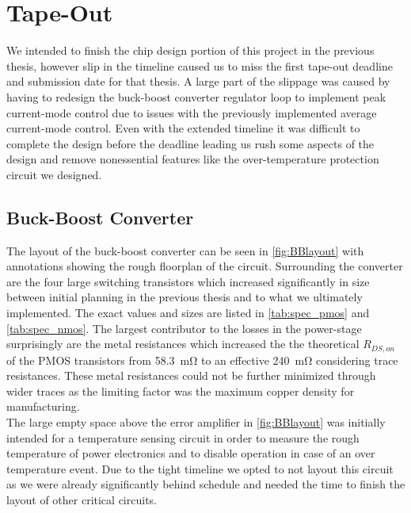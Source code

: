 \section{Tape-Out}
\label{sec:tapout}

We intended to finish the chip design portion of this project in the previous thesis, however slip in the timeline caused us to miss the first tape-out deadline and submission date for that thesis. A large part of the slippage was caused by having to redesign the buck-boost converter regulator loop to implement peak current-mode control due to issues with the previously implemented average current-mode control. Even with the extended timeline it was difficult to complete the design before the deadline leading us rush some aspects of the design and remove nonessential features like the over-temperature protection circuit we designed.

\subsection{Buck-Boost Converter}
The layout of the buck-boost converter can be seen in  \autoref{fig:BBlayout} with annotations showing the rough floorplan of the circuit. Surrounding the converter are the four large switching transistors which increased significantly in size between initial planning in the previous thesis and to what we ultimately implemented. The exact values and sizes are listed in \autoref{tab:spec_pmos} and \autoref{tab:spec_nmos}. The largest contributor to the losses in the power-stage surprisingly are the metal resistances which increased the the theoretical $R_{DS,on}$ of the \ac{PMOS} transistors from \qty{58.3}{\milli\ohm} to an effective \qty{240}{\milli\ohm} considering trace resistances. These metal resistances could not be further minimized through wider traces as the limiting factor was the maximum copper density for manufacturing. \\
The large empty space above the error amplifier in \autoref{fig:BBlayout} was initially intended for a temperature sensing circuit in order to measure the rough temperature of power electronics and to disable operation in case of an over temperature event. Due to the tight timeline we opted to not layout this circuit as we were already significantly behind schedule and needed the time to finish the layout of other critical circuits. 

